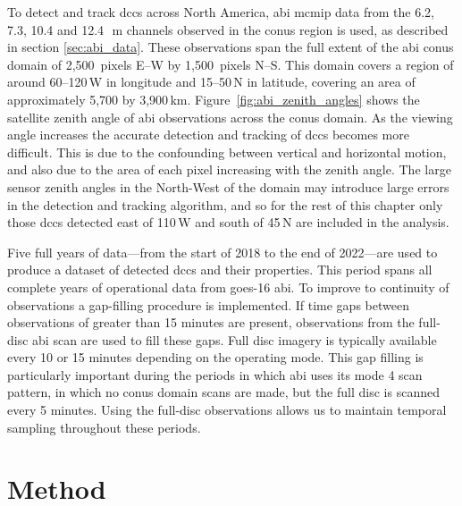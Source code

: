 To detect and track \acrshort{dcc}s across North America, \acrshort{abi} \acrshort{mcmip} data from the 6.2, 7.3, 10.4 and 12.4\,\unit{\mu m} channels observed in the \acrshort{conus} region is used, as described in section \ref{sec:abi_data}.
These observations span the full extent of the \acrshort{abi} \acrshort{conus} domain of 2,500~pixels E--W by 1,500~pixels N--S.
This domain covers a region of around 60--120\,\textdegree W in longitude and 15--50\,\textdegree N in latitude, covering an area of approximately 5,700 by 3,900\,\unit{km}.
Figure~\ref{fig:abi_zenith_angles} shows the satellite zenith angle of \acrshort{abi} observations across the \acrshort{conus} domain.
As the viewing angle increases the accurate detection and tracking of \acrshort{dcc}s becomes more difficult.
This is due to the confounding between vertical and horizontal motion, and also due to the area of each pixel increasing with the zenith angle.
The large sensor zenith angles in the North-West of the domain may introduce large errors in the detection and tracking algorithm, and so for the rest of this chapter only those \acrshort{dcc}s detected east of 110\,\textdegree W and south of 45\,\textdegree N are included in the analysis.

Five full years of data---from the start of 2018 to the end of 2022---are used to produce a dataset of detected \acrshort{dcc}s and their properties.
This period spans all complete years of operational data from \acrshort{goes}-16 \acrshort{abi}.
To improve to continuity of observations a gap-filling procedure is implemented.
If time gaps between observations of greater than 15 minutes are present, observations from the full-disc \acrshort{abi} scan are used to fill these gaps.
Full disc imagery is typically available every 10 or 15 minutes depending on the operating mode.
This gap filling is particularly important during the periods in which \acrshort{abi} uses its mode 4 scan pattern, in which no \acrshort{conus} domain scans are made, but the full disc is scanned every 5 minutes.
Using the full-disc observations allows us to maintain temporal sampling throughout these periods.


\section{Method} \label{sec:conus_method}

